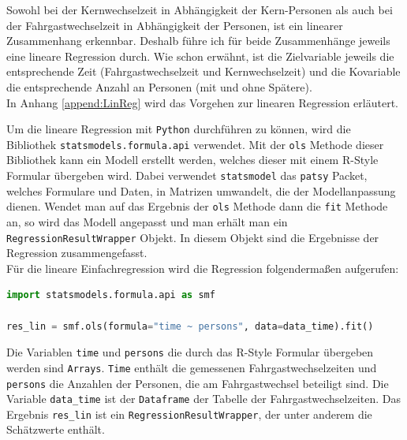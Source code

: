 Sowohl bei der Kernwechselzeit in Abhängigkeit der Kern-Personen als auch bei der Fahrgastwechselzeit in Abhängigkeit der Personen, ist ein linearer Zusammenhang erkennbar. Deshalb führe ich für beide Zusammenhänge jeweils eine lineare Regression durch. Wie schon erwähnt, ist die Zielvariable jeweils die entsprechende Zeit (Fahrgastwechselzeit und Kernwechselzeit) und die Kovariable die entsprechende Anzahl an Personen (mit und ohne Spätere). \\
In Anhang \ref{append:LinReg} wird das Vorgehen zur linearen Regression erläutert.

Um die lineare Regression mit \texttt{Python} durchführen zu können, wird die Bibliothek \texttt{statsmodels.formula.api} verwendet. Mit der \texttt{ols} Methode dieser Bibliothek kann ein Modell erstellt werden, welches dieser mit einem R-Style Formular übergeben wird. Dabei verwendet \texttt{statsmodel} das \texttt{patsy} Packet, welches Formulare und Daten, in Matrizen umwandelt, die der Modellanpassung dienen. Wendet man auf das Ergebnis der \texttt{ols} Methode dann die \texttt{fit} Methode an, so wird das Modell angepasst und  man erhält man ein \texttt{RegressionResultWrapper} Objekt. In diesem Objekt sind die Ergebnisse der Regression zusammengefasst. \\
Für die lineare Einfachregression wird die Regression folgendermaßen aufgerufen:
\begin{lstlisting}[language=Python]
import statsmodels.formula.api as smf

res_lin = smf.ols(formula="time ~ persons", data=data_time).fit()
\end{lstlisting}
Die Variablen \texttt{time} und \texttt{persons} die durch das R-Style Formular übergeben werden sind \texttt{Arrays}. \texttt{Time} enthält die gemessenen Fahrgastwechselzeiten und \texttt{persons} die Anzahlen der Personen, die am Fahrgastwechsel beteiligt sind. Die Variable \texttt{data\_time} ist der \texttt{Dataframe} der Tabelle der Fahrgastwechselzeiten. Das Ergebnis \texttt{res\_lin} ist ein \texttt{RegressionResultWrapper}, der unter anderem die Schätzwerte enthält.

